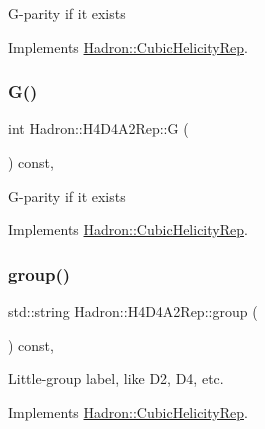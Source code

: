 G-\/parity if it exists 

Implements \mbox{\hyperlink{structHadron_1_1CubicHelicityRep_a50689f42be1e6170aa8cf6ad0597018b}{Hadron\+::\+Cubic\+Helicity\+Rep}}.

\mbox{\label{structHadron_1_1H4D4A2Rep_add691ecf1c27769c705c534dcf292602}} 
\subsubsection{\texorpdfstring{G()}{G()}\hspace{0.1cm}{\footnotesize\ttfamily [2/2]}}
{\footnotesize\ttfamily int Hadron\+::\+H4\+D4\+A2\+Rep\+::G (\begin{DoxyParamCaption}{ }\end{DoxyParamCaption}) const\hspace{0.3cm}{\ttfamily [inline]}, {\ttfamily [virtual]}}

G-\/parity if it exists 

Implements \mbox{\hyperlink{structHadron_1_1CubicHelicityRep_a50689f42be1e6170aa8cf6ad0597018b}{Hadron\+::\+Cubic\+Helicity\+Rep}}.

\mbox{\label{structHadron_1_1H4D4A2Rep_a84c4465f2963fe5e6d241882ff28ddae}} 
\subsubsection{\texorpdfstring{group()}{group()}\hspace{0.1cm}{\footnotesize\ttfamily [1/3]}}
{\footnotesize\ttfamily std\+::string Hadron\+::\+H4\+D4\+A2\+Rep\+::group (\begin{DoxyParamCaption}{ }\end{DoxyParamCaption}) const\hspace{0.3cm}{\ttfamily [inline]}, {\ttfamily [virtual]}}

Little-\/group label, like D2, D4, etc. 

Implements \mbox{\hyperlink{structHadron_1_1CubicHelicityRep_a101a7d76cd8ccdad0f272db44b766113}{Hadron\+::\+Cubic\+Helicity\+Rep}}.

\mbox{\label{structHadron_1_1H4D4A2Rep_a84c4465f2963fe5e6d241882ff28ddae}} 
